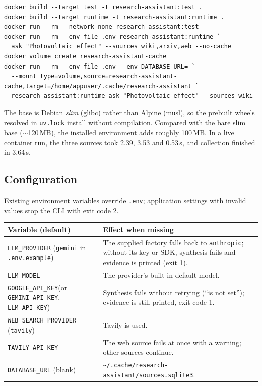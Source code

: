 \documentclass[11pt,a4paper]{article}
\newcommand{\cmd}[1]{\texttt{#1}}
\begin{document}
\begin{lstlisting}[style=plain]
docker build --target test -t research-assistant:test .
docker build --target runtime -t research-assistant:runtime .
docker run --rm --network none research-assistant:test
docker run --rm --env-file .env research-assistant:runtime `
  ask "Photovoltaic effect" --sources wiki,arxiv,web --no-cache
docker volume create research-assistant-cache
docker run --rm --env-file .env --env DATABASE_URL= `
  --mount type=volume,source=research-assistant-cache,target=/home/appuser/.cache/research-assistant `
  research-assistant:runtime ask "Photovoltaic effect" --sources wiki
\end{lstlisting}

The base is Debian \emph{slim} (glibc) rather than Alpine (musl), so the
prebuilt wheels resolved in \cmd{uv.lock} install without compilation.
Compared with the bare slim base ($\sim$120\,MB), the installed environment adds
roughly 100\,MB. In a live
container run, the three sources took 2.39, 3.53 and 0.53\,s, and collection
finished in 3.64\,s.

\subsection{Configuration}

Existing environment variables override \cmd{.env}; application settings with
invalid values stop the CLI with exit code 2.

\begin{center}\small
\begin{tabularx}{\textwidth}{@{}>{\raggedright\arraybackslash}p{}X@{}}
\toprule
\textbf{Variable (default)} & \textbf{Effect when missing} \\
\midrule
\cmd{LLM\_PROVIDER} (\cmd{gemini} in \cmd{.env.example}) & The supplied factory falls back to \cmd{anthropic}; without its key or SDK, synthesis fails and evidence is printed (exit 1). \\
\cmd{LLM\_MODEL} & The provider's built-in default model. \\
\cmd{GOOGLE\_API\_KEY}\newline (or \cmd{GEMINI\_API\_KEY}, \cmd{LLM\_API\_KEY}) & Synthesis fails without retrying (``is not set''); evidence is still printed, exit code 1. \\
\cmd{WEB\_SEARCH\_PROVIDER} (\cmd{tavily}) & Tavily is used. \\
\cmd{TAVILY\_API\_KEY} & The web source fails at once with a warning; other sources continue. \\
\cmd{DATABASE\_URL} (blank) & \cmd{\textasciitilde/.cache/research-assistant/sources.sqlite3}. \\
\bottomrule
\end{tabularx}
\end{center}
\end{document}
